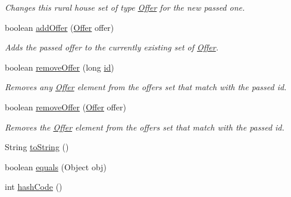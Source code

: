 \begin{DoxyCompactItemize}
\begin{DoxyCompactList}\small\item\em Changes this rural house set of type \mbox{\hyperlink{classcom_1_1ruralhousejsf_1_1domain_1_1_offer}{Offer}} for the new passed one. \end{DoxyCompactList}\item 
boolean \mbox{\hyperlink{classcom_1_1ruralhousejsf_1_1domain_1_1_rural_house_a42b59123f7f6ac871f5510bb19a98884}{add\+Offer}} (\mbox{\hyperlink{classcom_1_1ruralhousejsf_1_1domain_1_1_offer}{Offer}} offer)
\begin{DoxyCompactList}\small\item\em Adds the passed offer to the currently existing set of \mbox{\hyperlink{classcom_1_1ruralhousejsf_1_1domain_1_1_offer}{Offer}}. \end{DoxyCompactList}\item 
boolean \mbox{\hyperlink{classcom_1_1ruralhousejsf_1_1domain_1_1_rural_house_ab6443a7d5fdef35c6a04110d497ddb16}{remove\+Offer}} (long \mbox{\hyperlink{classcom_1_1ruralhousejsf_1_1domain_1_1_rural_house_ad9352e84ead5c4feb7eadee60570d9de}{id}})
\begin{DoxyCompactList}\small\item\em Removes any \mbox{\hyperlink{classcom_1_1ruralhousejsf_1_1domain_1_1_offer}{Offer}} element from the offers set that match with the passed id. \end{DoxyCompactList}\item 
boolean \mbox{\hyperlink{classcom_1_1ruralhousejsf_1_1domain_1_1_rural_house_a36466194bda46f454c816aa5845c0d14}{remove\+Offer}} (\mbox{\hyperlink{classcom_1_1ruralhousejsf_1_1domain_1_1_offer}{Offer}} offer)
\begin{DoxyCompactList}\small\item\em Removes the \mbox{\hyperlink{classcom_1_1ruralhousejsf_1_1domain_1_1_offer}{Offer}} element from the offers set that match with the passed id. \end{DoxyCompactList}\item 
String \mbox{\hyperlink{classcom_1_1ruralhousejsf_1_1domain_1_1_rural_house_a33c5888213bc3b3f5a4d3c0015f9d033}{to\+String}} ()
\item 
boolean \mbox{\hyperlink{classcom_1_1ruralhousejsf_1_1domain_1_1_rural_house_affbd64026d988c58be52b7f7e5ebfbe8}{equals}} (Object obj)
\item 
int \mbox{\hyperlink{classcom_1_1ruralhousejsf_1_1domain_1_1_rural_house_a12fcb2ec3f802b71b5a1357622255b86}{hash\+Code}} ()
\end{DoxyCompactItemize}
